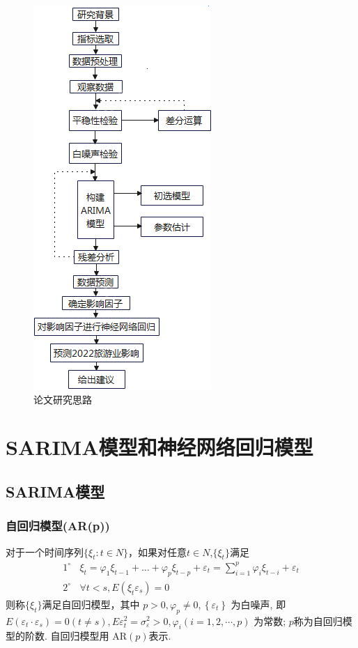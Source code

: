 \begin{figure}[htbp]
	\centering
	\includegraphics[scale=0.75,angle=0]{images/1.png}
	\caption{论文研究思路}
	\label{1}
\end{figure}



\section{SARIMA模型和神经网络回归模型}
	\subsection{SARIMA模型}
		\subsubsection{自回归模型(AR(p))}
		对于一个时间序列$\{\xi _t:t \in N\}$，如果对任意$t \in N$,$\{\xi_t \}$满足
		\begin{gather}
		1^{\circ} ~~~~\xi_t=\varphi_1 \xi_{t-1}+ \dots + \varphi_p \xi_{t-p} + \varepsilon_t =\sum_{i=1}^{p} \varphi_i\xi_{t-i}+\varepsilon_t 
		\\
		2^{\circ} ~~~~\forall t<s,E(\xi_t\varepsilon _s)=0
		\end{gather}
		则称$\{\xi_t\}$满足自回归模型，其中  $p>0, \varphi_{p} \neq 0,\left\{\varepsilon_{t}\right\} $ 为白噪声, 即  $E\left(\varepsilon_{t} \cdot \varepsilon_{s}\right)=0(t \neq s), E \varepsilon_{t}^{2}=\sigma_{\varepsilon}^{2}   >0, \varphi_{i}(i=1,2, \cdots, p) $ 为常数;
		$p$称为自回归模型的阶数. 自回归模型用 $ \mathrm{AR}(p)  $表示.
		

